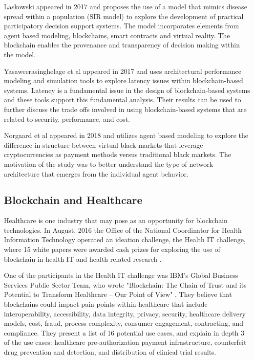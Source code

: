\documentclass[12pt]{report}
\begin{document}
Laskowski \cite{Laskowski.2017} appeared in 2017 and proposes the use of a model that mimics disease spread within a population (SIR model) to explore the development of practical participatory decision support systems. The model incorporates elements from agent based modeling, blockchains, smart contracts and virtual reality. The blockchain enables the provenance and transparency of decision making within the model.

Yasaweerasinghelage et al \cite{Yasaweerasinghelage.2017} appeared in 2017 and uses architectural performance modeling and simulation tools to explore latency issues within blockchain-based systems. Latency is a fundamental issue in the design of blockchain-based systems and these tools support this fundamental analysis. Their results can be used to further discuss the trade offs involved in using blockchain-based systems that are related to security, performance, and cost.

Norgaard et al \cite{NORGAARD.} appeared in 2018 and utilizes agent based modeling to explore the difference in structure between virtual black markets that leverage cryptocurrencies as payment methods versus traditional black markets. The motivation of the study was to better understand the type of network architecture that emerges from the individual agent behavior. 

\subsection{Blockchain and Healthcare}
\label{sec:litrx}
Healthcare is one industry that may pose as an opportunity for blockchain technologies. In August, 2016 the Office of the National Coordinator for Health Information Technology operated an ideation challenge, the Health IT challenge, where 15 white papers were awarded cash prizes for exploring the use of blockchain in health IT and health-related research \cite{.2192018}.

One of the participants in the Health IT challenge was IBM's Global Business Services Public Sector Team, who wrote "Blockchain: The Chain of Trust and its Potential to Transform Healthcare -- Our Point of View" \cite{IBMGlobalBusinessServicesPublicSectorTeam.2016}. They believe that blockchains could impact pain points within healthcare that include interoperability, accessibility, data integrity, privacy, security, healthcare delivery models, cost, fraud, process complexity, consumer engagement, contracting, and compliance. They present a list of 16 potential use cases, and explain in depth 3 of the use cases: healthcare pre-authorization payment infrastructure, counterfeit drug prevention and detection, and distribution of clinical trial results.
\end{document}
